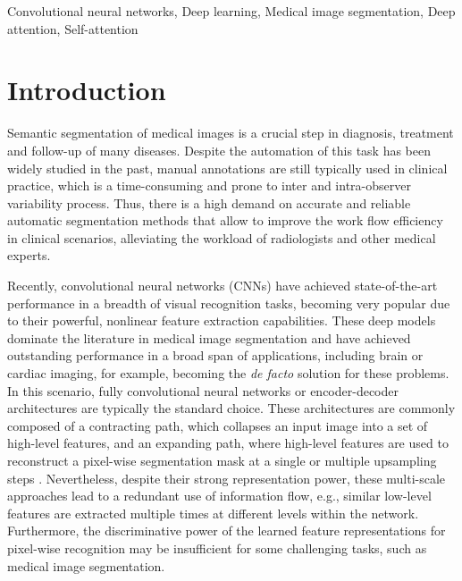 \documentclass[journal]{IEEEtran}
\begin{document}
\begin{IEEEkeywords}
Convolutional neural networks, Deep learning, Medical image segmentation, Deep attention, Self-attention
\end{IEEEkeywords}



\maketitle 

\section{Introduction}



Semantic segmentation of medical images is a crucial step in diagnosis, treatment and follow-up of many diseases. Despite the automation of this task has been widely studied in the past, manual annotations are still typically used in clinical practice, which is a time-consuming and prone to inter and intra-observer variability process. Thus, there is a high demand on accurate and reliable automatic segmentation methods that allow to improve the work flow efficiency in clinical scenarios, alleviating the workload of radiologists and other medical experts.  






Recently, convolutional neural networks (CNNs) have achieved state-of-the-art performance in a breadth of visual recognition tasks, becoming very popular due to their powerful, nonlinear feature extraction capabilities. These deep models dominate the literature in medical image segmentation \cite{litjens2017survey} and have achieved outstanding performance in a broad span of applications, including brain \cite{dolz2018hyperdense} or cardiac \cite{bernard2018deep} imaging, for example, becoming the \textit{de facto} solution for these problems. In this scenario, fully convolutional neural networks \cite{FCN} or encoder-decoder architectures \cite{ronneberger2015u,lin2017refinenet} are typically the standard choice. These architectures are commonly composed of a contracting path, which collapses an input image into a set of high-level features, and an expanding path, where high-level features are used to reconstruct a pixel-wise segmentation mask at a single \cite{FCN} or multiple upsampling steps \cite{ronneberger2015u,lin2017refinenet}. Nevertheless, despite their strong representation power, these multi-scale approaches lead to a redundant use of information flow, e.g., similar low-level features are extracted multiple times at different levels within the network. Furthermore, the discriminative power of the learned feature representations for pixel-wise recognition may be insufficient for some challenging tasks, such as medical image segmentation.
\end{document}

